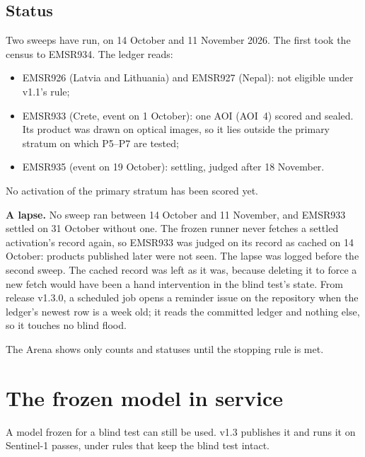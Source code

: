\documentclass[10pt,twocolumn,a4paper]{article}
\begin{document}
\subsection{Status}
Two sweeps have run, on 14 October and 11 November 2026. The first took the census to EMSR934. The ledger reads:
\begin{itemize}
  \item EMSR926 (Latvia and Lithuania) and EMSR927 (Nepal): not eligible under v1.1's rule;
  \item EMSR933 (Crete, event on 1 October): one AOI (AOI~4) scored and sealed. Its product was drawn on optical
    images, so it lies outside the primary stratum on which P5--P7 are tested;
  \item EMSR935 (event on 19 October): settling, judged after 18 November.
\end{itemize}
No activation of the primary stratum has been scored yet.

\textbf{A lapse.} No sweep ran between 14 October and 11 November, and EMSR933 settled on 31 October without one.
The frozen runner never fetches a settled activation's record again, so EMSR933 was judged on its record as cached
on 14 October: products published later were not seen. The lapse was logged before the second sweep. The cached
record was left as it was, because deleting it to force a new fetch would have been a hand intervention in the
blind test's state. From release v1.3.0, a scheduled job opens a reminder issue on the repository when the ledger's
newest row is a week old; it reads the committed ledger and nothing else, so it touches no blind flood.

The Arena shows only counts and statuses until the stopping rule is met.

\section{The frozen model in service}\label{sec:live}
A model frozen for a blind test can still be used. v1.3 publishes it and runs it on Sentinel-1 passes, under rules
that keep the blind test intact.
\end{document}
